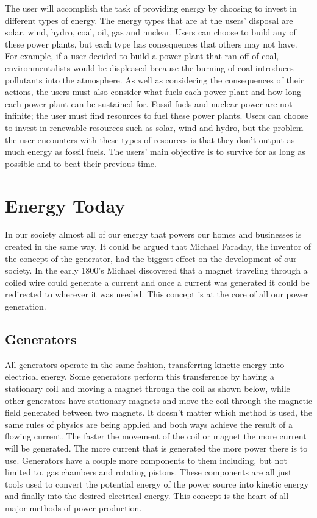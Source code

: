 \documentclass[msc,oneside]{ubcthesis}%
\begin{document}
The user will accomplish the task of providing energy by choosing to invest in different types of energy. 
The energy types that are at the users' disposal are solar, wind, hydro, coal, oil, gas and nuclear. Users 
can choose to build any of these power plants, but each type has consequences that others may not have. For 
example, if a user decided to build a power plant that ran off of coal, environmentalists would be 
displeased because the burning of coal introduces pollutants into the atmosphere. As well as considering 
the consequences of their actions, the users must also consider what fuels each power plant and how long 
each power plant can be sustained for. Fossil fuels and nuclear power are not infinite; the user must find 
resources to fuel these power plants. Users can choose to invest in renewable resources such as solar, wind 
and hydro, but the problem the user encounters with these types of resources is that they don't output as 
much energy as fossil fuels. The users' main objective is to survive for as long as possible and to beat 
their previous time. 

\chapter{Energy Today}
  In our society almost all of our energy that powers our homes and businesses is created in the same way. 
It could be argued that Michael Faraday, the inventor of the concept of the generator, had the biggest 
effect on the development of our society. In the early 1800's Michael discovered that a magnet traveling 
through a coiled wire could generate a current and once a current was generated it could be redirected 
to wherever it was needed. This concept is at the core of all our power generation.

\section{Generators}
  
  All generators operate in the same fashion, transferring kinetic energy into electrical energy. Some generators perform this transference by having a stationary coil and moving a magnet through the coil as shown below, while other generators have stationary magnets and move the coil through the magnetic field generated between two magnets. It doesn't matter which method is used, the same rules of physics are being applied and both ways achieve the result of a flowing current. The faster the movement of the coil or magnet the more current will be generated. 
  The more current that is generated the more power there is to use. Generators have a couple more components to them including, but not limited to, gas chambers and rotating pistons. These components are all just tools used to convert the potential energy of the power source into kinetic energy and finally into the desired electrical energy. This concept is the heart of all major methods of power production.
\end{document}
